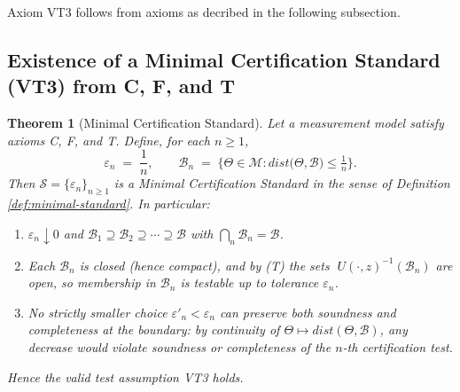 \documentclass[12pt]{article}
\theoremstyle{definition}
\theoremstyle{plain}
\newtheorem{theorem}{Theorem}[section]
\begin{document}
Axiom VT3 follows from axioms as decribed in the following subsection.

\subsection{Existence of a Minimal Certification Standard (VT3) from C, F, and T}

\begin{theorem}[Minimal Certification Standard]\label{thm:minimal-standard-existence}
Let a measurement model satisfy axioms C, F, and T.
Define, for each \(n\ge1\),
\[
  \varepsilon_n \;=\;\frac1n,
  \qquad
  \mathcal B_n \;=\;\bigl\{\Theta\in\mathcal M : dist\bigl(\Theta,\mathcal B\bigr)\le\tfrac1n\bigr\}.
\]
Then \(\mathcal S=\{\varepsilon_n\}_{n\ge1}\) is a Minimal Certification Standard in the sense of Definition \ref{def:minimal-standard}.  In particular:
\begin{enumerate}[label=(\roman*),itemsep=2pt]
  \item \(\varepsilon_n\downarrow0\) and \(\mathcal B_1\supseteq\mathcal B_2\supseteq\cdots\supseteq\mathcal B\) with \(\bigcap_n\mathcal B_n=\mathcal B\).
  \item Each \(\mathcal B_n\) is closed (hence compact), and by (T) the sets 
  \(\;U(\cdot,z)^{-1}(\mathcal B_n)\) 
  are open, so membership in \(\mathcal B_n\) is testable up to tolerance \(\varepsilon_n\).
  \item No strictly smaller choice \(\varepsilon'_n<\varepsilon_n\) can preserve both soundness and completeness at the boundary: by continuity of \(\Theta\mapsto dist(\Theta,\mathcal B)\), any decrease would violate soundness or completeness of the \(n\)-th certification test.
\end{enumerate}
Hence the valid test assumption VT3 holds.
\end{theorem}
\end{document}
